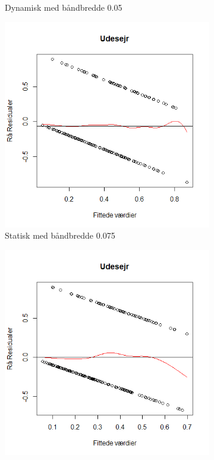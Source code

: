 \documentclass[11pt,a4paper]{article}
\begin{document}
\begin{figure}[h!]
\begin{subfigure}[b]{0.425\linewidth}
    \caption{Dynamisk med båndbredde 0.05}
    \label{fig:ResDHS}
  \end{subfigure}
  \begin{subfigure}[b]{0.425\linewidth}
    \includegraphics[width=\linewidth]{ResSUS.png}
    \caption{Statisk med båndbredde 0.075}
    \label{fig:ResSUS}
  \end{subfigure}
  \begin{subfigure}[b]{0.425\linewidth}
    \includegraphics[width=\linewidth]{ResDUS.png}

\end{subfigure}
\end{figure}
\end{document}
